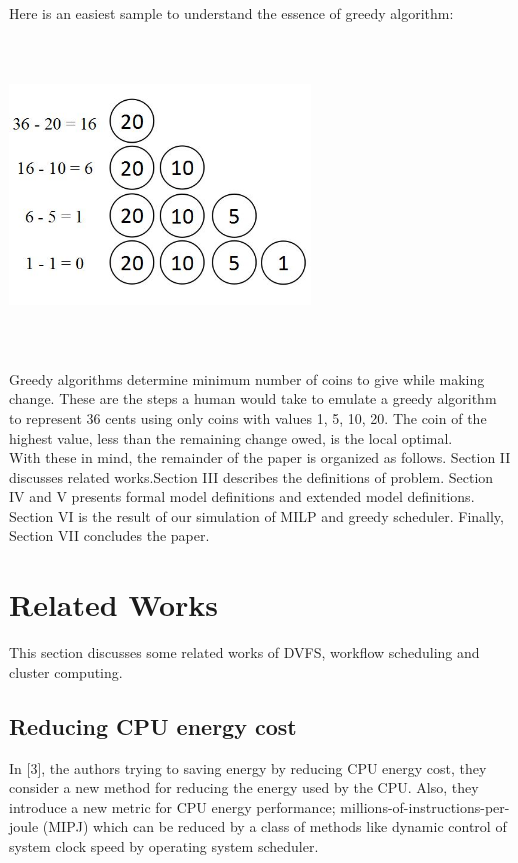 \documentclass[conference]{IEEEtran}
\begin{document}
Here is an easiest sample to understand the essence of greedy algorithm:\\\\
\includegraphics[width=8cm,height=8cm,keepaspectratio]{5.JPG}\\
\\Greedy algorithms determine minimum number of coins to give while making change. These are the steps a human would take to emulate a greedy algorithm to represent 36 cents using only coins with values {1, 5, 10, 20}. The coin of the highest value, less than the remaining change owed, is the local optimal.\\

With these in mind, the remainder of the paper is organized as follows. Section II discusses related works.Section III describes the definitions of  problem. Section IV and V presents formal model definitions and extended model definitions.  Section VI is the result of our simulation of MILP and greedy scheduler. Finally, Section VII concludes the paper.\\

\section{Related Works}
This section discusses some related works of DVFS, workflow scheduling and cluster computing.

\subsection{ Reducing CPU energy cost}

In [3], the authors trying to saving energy by reducing CPU energy cost, they consider a new method for reducing the energy used by the CPU. Also, they introduce a new metric for CPU energy performance; millions-of-instructions-per-joule (MIPJ) which can be reduced by a class of methods like dynamic control of system clock speed by operating system scheduler.
\end{document}
